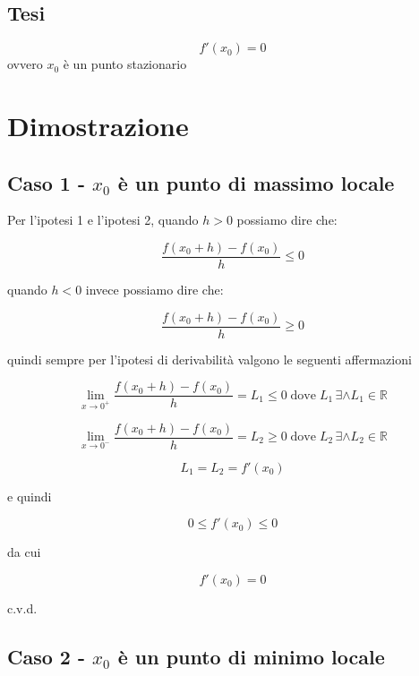 \documentclass[../dimostrazioni]{subfiles}
\begin{document}
            \subsection*{Tesi}

                \[f'(x_0) = 0\] ovvero \(x_0\) è un punto stazionario

        \section*{Dimostrazione}

            \medskip

            \subsection*{Caso 1 - \(x_0\) è un punto di massimo locale}

                \smallskip

                Per l'ipotesi 1 e l'ipotesi 2, quando \(h>0\) possiamo dire che:
                
                \[\frac{f(x_0 + h) - f(x_0)}{h}  \leqslant 0\]

                quando \(h<0\) invece possiamo dire che:

                \[\frac{f(x_0 + h) - f(x_0)}{h}  \geqslant 0\]

                quindi sempre per l'ipotesi di derivabilità valgono le seguenti affermazioni
                
                \[\lim_{x\to 0^+} \frac{f(x_0 + h) - f(x_0)}{h} = L_1 \leqslant 0 \; \text{dove} \; L_1 \, \exists \land L_1 \in \mathbb{R} \]

                \[\lim_{x\to 0^-} \frac{f(x_0 + h) - f(x_0)}{h} = L_2  \geqslant 0 \; \text{dove} \; L_2 \, \exists \land L_2 \in \mathbb{R} \]

                \[L_1 = L_2 = f'(x_0)\]
                
                e quindi
                
                \[0 \leqslant f'(x_0) \leqslant 0\]
                
                da cui
                
                \[f'(x_0)=0\]
                
                c.v.d.

            \subsection*{Caso 2 - \(x_0\) è un punto di minimo locale}
\end{document}
